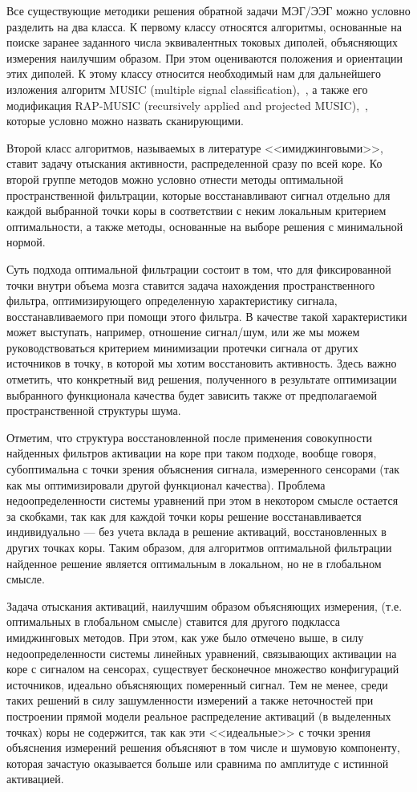 Все существующие методики решения обратной задачи МЭГ/ЭЭГ можно условно
разделить на два класса.
К первому классу относятся алгоритмы, основанные на
поиске заранее заданного числа эквивалентных токовых диполей, объясняющих измерения
наилучшим образом. При этом оцениваются положения и ориентации этих диполей.
К этому классу относится необходимый нам для дальнейшего изложения алгоритм %
MUSIC (multiple signal classification),~\cite{Mosher1992, Schmidt1986}, а также его модификация RAP-MUSIC
(recursively applied and projected MUSIC),~\cite{Mosher1999}, которые условно можно назвать сканирующими.

Второй класс алгоритмов, называемых в литературе <<имиджинговыми>>, ставит задачу
отыскания активности, распределенной сразу по всей коре. Ко второй группе методов
можно условно отнести методы оптимальной пространственной фильтрации, которые
восстанавливают сигнал отдельно для каждой выбранной точки коры в соответствии
с неким локальным критерием оптимальности, а также методы, основанные на выборе
решения с минимальной нормой.

Суть подхода оптимальной фильтрации состоит в том, что для
фиксированной точки внутри объема мозга ставится задача нахождения
пространственного фильтра, оптимизирующего определенную характеристику сигнала,
восстанавливаемого при помощи этого фильтра. В качестве такой характеристики
может выступать, например, отношение сигнал/шум, или же мы можем
руководствоваться критерием минимизации протечки сигнала от других источников в
точку, в которой мы хотим восстановить активность.  Здесь важно отметить, что
конкретный вид решения, полученного в результате оптимизации выбранного
функционала качества будет зависить также от предполагаемой пространственной
структуры шума.

Отметим, что структура восстановленной после применения совокупности найденных
фильтров активации на коре при таком подходе, вообще говоря, субоптимальна с
точки зрения объяснения сигнала, измеренного сенсорами (так как мы
оптимизировали другой функционал качества). Проблема недоопределенности
системы уравнений при этом в некотором смысле остается за скобками, так как для
каждой точки коры решение восстанавливается индивидуально --- без учета вклада
в решение активаций, восстановленных в других точках коры.  Таким образом, для
алгоритмов оптимальной фильтрации найденное решение является
оптимальным в локальном, но не в глобальном смысле.

Задача отыскания активаций, наилучшим образом объясняющих измерения, (т.е.
оптимальных в глобальном смысле) ставится для другого подкласса имиджинговых
методов.
При этом, как уже было отмечено выше, в силу
недоопределенности системы линейных уравнений, связывающих активации на коре с
сигналом на сенсорах, существует бесконечное множество конфигураций источников,
идеально объясняющих померенный сигнал. Тем не менее, среди таких решений в
силу зашумленности измерений а также неточностей при построении прямой модели
реальное распределение активаций (в выделенных точках) коры не содержится, так
как эти <<идеальные>> с точки зрения объяснения измерений решения объясняют в том
числе и шумовую компоненту, которая зачастую оказывается больше или сравнима по
амплитуде с истинной активацией.

